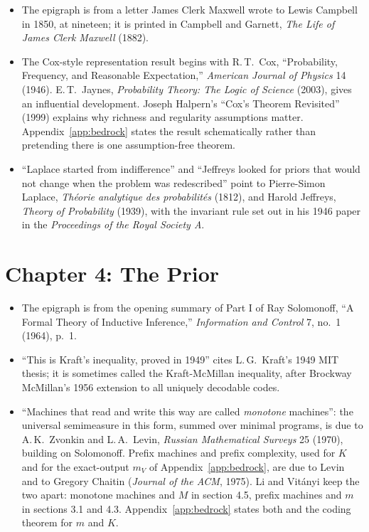 \begin{itemize}
\setlength{\itemsep}{0.5em}
\item The epigraph is from a letter James Clerk Maxwell wrote to Lewis Campbell in 1850, at nineteen; it is printed in Campbell and Garnett, \textit{The Life of James Clerk Maxwell} (1882).
\item The Cox-style representation result begins with R.\,T.\ Cox, ``Probability, Frequency, and Reasonable Expectation,'' \textit{American Journal of Physics} 14 (1946). E.\,T.\ Jaynes, \textit{Probability Theory: The Logic of Science} (2003), gives an influential development. Joseph Halpern's ``Cox's Theorem Revisited'' (1999) explains why richness and regularity assumptions matter. Appendix~\ref{app:bedrock} states the result schematically rather than pretending there is one assumption-free theorem.
\item ``Laplace started from indifference'' and ``Jeffreys looked for priors that would not change when the problem was redescribed'' point to Pierre-Simon Laplace, \textit{Th\'eorie analytique des probabilit\'es} (1812), and Harold Jeffreys, \textit{Theory of Probability} (1939), with the invariant rule set out in his 1946 paper in the \textit{Proceedings of the Royal Society A}.
\end{itemize}

\section*{Chapter 4: The Prior}

\begin{itemize}
\setlength{\itemsep}{0.5em}
\item The epigraph is from the opening summary of Part I of Ray Solomonoff, ``A Formal Theory of Inductive Inference,'' \textit{Information and Control} 7, no.~1 (1964), p.~1.
\item ``This is Kraft's inequality, proved in 1949'' cites L.\,G.\ Kraft's 1949 MIT thesis; it is sometimes called the Kraft-McMillan inequality, after Brockway McMillan's 1956 extension to all uniquely decodable codes.
\item ``Machines that read and write this way are called \textit{monotone} machines'': the universal semimeasure in this form, summed over minimal programs, is due to A.\,K.\ Zvonkin and L.\,A.\ Levin, \textit{Russian Mathematical Surveys} 25 (1970), building on Solomonoff. Prefix machines and prefix complexity, used for $K$ and for the exact-output $m_V$ of Appendix~\ref{app:bedrock}, are due to Levin and to Gregory Chaitin (\textit{Journal of the ACM}, 1975). Li and Vit\'anyi keep the two apart: monotone machines and $M$ in section 4.5, prefix machines and $m$ in sections 3.1 and 4.3. Appendix~\ref{app:bedrock} states both and the coding theorem for $m$ and $K$.
\end{itemize}


